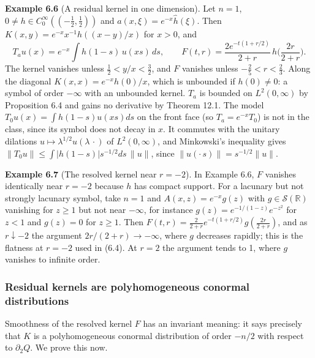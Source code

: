 \documentclass[
  11pt,
]{article}
\begin{document}
\textbf{Example 6.6} (A residual kernel in one dimension). Let \(n=1\),
\(0\neq h\in C_0^\infty((-\tfrac12,\tfrac12))\) and
\(a(x,\xi)=e^{-x}\widehat h(\xi)\). Then
\(K(x,y)=e^{-x}x^{-1}h((x-y)/x)\) for \(x>0\), and \[
T_au(x)=e^{-x}\int h(1-s)\,u(xs)\,ds,\qquad F(t,r)=\frac{2e^{-t(1+r/2)}}{2+r}\,h\Big(\frac{2r}{2+r}\Big).
\] The kernel vanishes unless \(\tfrac12<y/x<\tfrac32\), and \(F\)
vanishes unless \(-\tfrac25<r<\tfrac23\). Along the diagonal
\(K(x,x)=e^{-x}h(0)/x\), which is unbounded if \(h(0)\neq0\): a symbol
of order \(-\infty\) with an unbounded kernel. \(T_a\) is bounded on
\(L^2(0,\infty)\) by Proposition 6.4 and gains no derivative by Theorem
12.1. The model \(T_0u(x)=\int h(1-s)u(xs)ds\) on the front face (so
\(T_a=e^{-x}T_0\)) is not in the class, since its symbol does not decay
in \(x\). It commutes with the unitary dilations
\(u\mapsto\lambda^{1/2}u(\lambda\,\cdot)\) of \(L^2(0,\infty)\), and
Minkowski's inequality gives
\(\|T_0u\|\leq\int|h(1-s)|s^{-1/2}ds\,\|u\|\), since
\(\|u(\cdot\,s)\|=s^{-1/2}\|u\|\).

\textbf{Example 6.7} (The resolved kernel near \(r=-2\)). In Example
6.6, \(F\) vanishes identically near \(r=-2\) because \(h\) has compact
support. For a lacunary but not strongly lacunary symbol, take \(n=1\)
and \(A(x,z)=e^{-x}g(z)\) with \(g\in\mathcal S(\mathbb R)\) vanishing
for \(z\geq1\) but not near \(-\infty\), for instance
\(g(z)=e^{-1/(1-z)}e^{-z^2}\) for \(z<1\) and \(g(z)=0\) for \(z\geq1\).
Then \(F(t,r)=\tfrac2{2+r}e^{-t(1+r/2)}g(\tfrac{2r}{2+r})\), and as
\(r\downarrow-2\) the argument \(2r/(2+r)\to-\infty\), where \(g\)
decreases rapidly; this is the flatness at \(r=-2\) used in (6.4). At
\(r=2\) the argument tends to 1, where \(g\) vanishes to infinite order.

\subsubsection{Residual kernels are polyhomogeneous conormal
distributions}\label{residual-kernels-are-polyhomogeneous-conormal-distributions}

Smoothness of the resolved kernel \(F\) has an invariant meaning: it
says precisely that \(K\) is a polyhomogeneous conormal distribution of
order \(-n/2\) with respect to \(\partial_2Q\). We prove this now.
\end{document}
